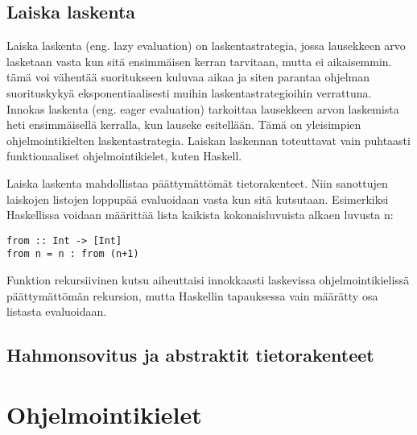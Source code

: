 \subsection{Laiska laskenta}
Laiska laskenta (eng. lazy evaluation) on laskentastrategia, jossa lausekkeen arvo lasketaan vasta kun sitä ensimmäisen
kerran tarvitaan, mutta ei aikaisemmin. tämä voi vähentää suoritukseen kuluvaa aikaa ja siten parantaa ohjelman
suorituskykyä eksponentiaalisesti muihin laskentastrategioihin verrattuna. Innokas laskenta (eng. eager evaluation)
tarkoittaa lausekkeen arvon laskemista heti ensimmäisellä kerralla, kun lauseke esitellään. Tämä on yleisimpien
ohjelmointikielten laskentastrategia. Laiskan laskennan toteuttavat vain puhtaasti funktionaaliset ohjelmointikielet,
kuten Haskell.\cite{languagedesign}

Laiska laskenta mahdollistaa päättymättömät tietorakenteet. Niin sanottujen laiskojen listojen loppupää evaluoidaan
vasta kun sitä kutsutaan. Esimerkiksi Haskellissa voidaan määrittää lista kaikista kokonaisluvuista alkaen luvusta n:
\begin{verbatim}
from :: Int -> [Int]
from n = n : from (n+1)
\end{verbatim}
Funktion rekursiivinen kutsu aiheuttaisi innokkaasti laskevissa ohjelmointikielissä päättymättömän rekursion, mutta
Haskellin tapauksessa vain määrätty osa listasta evaluoidaan.


\subsection{Hahmonsovitus ja abstraktit tietorakenteet}


\section{Ohjelmointikielet}

